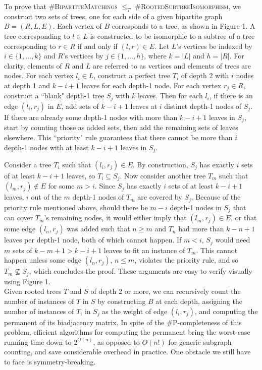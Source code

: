 \documentclass{article}
\begin{document}
   To prove that \#B\textsc{ipartite}M\textsc{atchings} $\leq_T$ \#R\textsc{ooted}S\textsc{ubtree}I\textsc{somorphism}, we construct two sets of trees, one for each side of a given bipartite graph $B = (R, L, E)$. Each vertex of $B$ corresponds to a tree, as shown in Figure 1. A tree corresponding to $l \in L$ is constructed to be isomorphic to a subtree of a tree corresponding to $r \in R$ if and only if $(l, r) \in E$. Let $L$'s vertices be indexed by $i \in \{1, \dots, k\}$ and $R$'s vertices by $j \in \{1, \dots, h\}$, where $k = |L|$ and $h = |R|$. For clarity, elements of $R$ and $L$ are referred to as vertices and elements of trees are nodes. For each vertex $l_i \in L$, construct a perfect tree $T_i$ of depth 2 with $i$ nodes at depth 1 and $k-i+1$ leaves for each depth-1 node. For each vertex $r_j \in R$, construct a ``blank" depth-1 tree $S_j$ with $k$ leaves. Then for each $l_i$, if there is an edge $(l_i, r_j)$ in $E$, add sets of $k-i+1$ leaves at $i$ distinct depth-1 nodes of $S_j$. If there are already some depth-1 nodes with more than $k-i+1$ leaves in $S_j$, start by counting those as added sets, then add the remaining sets of leaves elsewhere. This ``priority" rule guarantees that there cannot be more than $i$ depth-1 nodes with at least $k-i+1$ leaves in $S_j$. 


   Consider a tree $T_i$ such that $(l_i, r_j) \in E$. By construction, $S_j$ has exactly $i$ sets of at least $k-i+1$ leaves, so $T_i \subseteq S_j$. Now consider another tree $T_m$ such that $(l_m, r_j) \notin E$ for some $m > i$. Since $S_j$ has exactly $i$ sets of at least $k-i+1$ leaves, $i$ out of the $m$ depth-1 nodes of $T_m$ are covered by $S_j$. Because of the priority rule mentioned above, should there be $m-i$ depth-1 nodes in $S_j$ that can cover $T_m$'s remaining nodes, it would either imply that $(l_m, r_j) \in E$, or that some edge $(l_n, r_j)$ was added such that $n \geq m$ and $T_n$ had more than $k-n+1$ leaves per depth-1 node, both of which cannot happen. If $m < i$, $S_j$ would need $m$ sets of $k-m+1 > k-i+1$ leaves to fit an instance of $T_m$. This cannot happen unless some edge $(l_n, r_j)$, $n \leq m$, violates the priority rule, and so $T_m \nsubseteq S_j$, which concludes the proof. These arguments are easy to verify visually using Figure 1.
\\

    Given rooted trees $T$ and $S$ of depth 2 or more, we can recursively count the number of instances of $T$ in $S$ by constructing $B$ at each depth, assigning the number of instances of $T_i$ in $S_j$ as the weight of edge $(l_i, r_j)$, and computing the permanent of its biadjacency matrix. In spite of the \#P-completeness of this problem, efficient algorithms for computing the permanent bring the worst-case running time down to $2^{O(n)}$, as opposed to $O(n!)$ for generic subgraph counting, and save considerable overhead in practice.
    One obstacle we still have to face is symmetry-breaking. %
   \\ 
\end{document}
